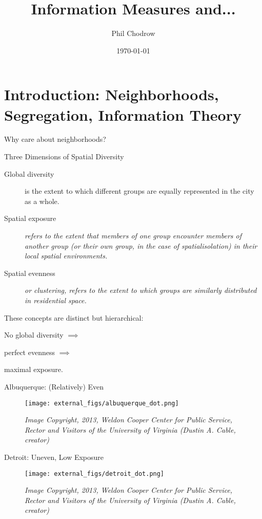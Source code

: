 \documentclass{beamer}
\title{Information Measures and...}
\date{\today}
\author{Phil Chodrow}
\institute{MIT Human Mobility and Networks Laboratory \& Operations Research Center}
\begin{document}
	\maketitle
	\section{Introduction: Neighborhoods, Segregation, Information Theory}

		\begin{frame}{Why care about neighborhoods?}

		\end{frame}

		\begin{frame}{Three Dimensions of Spatial Diversity}
			
			\begin{description}
				\item[Global diversity] is the extent to which different groups are equally represented in the city as a whole.  
				\item[Spatial exposure] \textit{refers to the extent that members of one group encounter members of another group (or their own group, in the case of spatialisolation) in their local spatial environments.} \cite{Reardon2004} 
				\item[Spatial evenness] \textit{or clustering, refers to the extent to which groups are similarly distributed in residential space.} \cite{Reardon2004}
			\end{description}
			
			These concepts are distinct but hierarchical: 

			No global diversity $\implies$ 

			perfect evenness $\implies$ 

			maximal exposure. 

  		\end{frame}

  		\begin{frame}{Albuquerque: (Relatively) Even}
	  		\begin{figure}
	  			\texttt{[image: external\_figs/albuquerque\_dot.png]}
	  			\caption{\textit{Image Copyright, 2013, Weldon Cooper Center for Public Service, Rector and Visitors of the University of Virginia (Dustin A. Cable, creator)}}
	  		\end{figure}
  		\end{frame}

		\begin{frame}{Detroit: Uneven, Low Exposure}
	  		\begin{figure}
	  			\texttt{[image: external\_figs/detroit\_dot.png]}
	  			\caption{\textit{Image Copyright, 2013, Weldon Cooper Center for Public Service, Rector and Visitors of the University of Virginia (Dustin A. Cable, creator)}}
	  		\end{figure}
  		\end{frame}
  		
\end{document}
